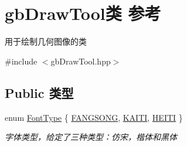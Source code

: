 \hypertarget{classgb_draw_tool}{}\section{gb\+Draw\+Tool类 参考}
\label{classgb_draw_tool}


用于绘制几何图像的类  




{\ttfamily \#include $<$gb\+Draw\+Tool.\+hpp$>$}

\subsection*{Public 类型}
\begin{DoxyCompactItemize}
\item 
enum \mbox{\hyperlink{classgb_draw_tool_ab260be43b4c80a5713b77723732a7b52}{Font\+Type}} \{ \mbox{\hyperlink{classgb_draw_tool_ab260be43b4c80a5713b77723732a7b52ad8c0229d0e5b8123a4d0d7351676f67d}{F\+A\+N\+G\+S\+O\+NG}}, 
\mbox{\hyperlink{classgb_draw_tool_ab260be43b4c80a5713b77723732a7b52a7365efa0251cc65e70f5776d68de6b71}{K\+A\+I\+TI}}, 
\mbox{\hyperlink{classgb_draw_tool_ab260be43b4c80a5713b77723732a7b52aa1bcfaeff02a45a2dacc2bb460e37160}{H\+E\+I\+TI}}
 \}
\begin{DoxyCompactList}\small\item\em 字体类型，给定了三种类型：仿宋，楷体和黑体 \end{DoxyCompactList}\end{DoxyCompactItemize}
